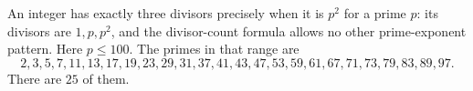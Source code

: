 An integer has exactly three divisors precisely when it is $p^2$ for a prime $p$: its divisors are $1,p,p^2$, and the divisor-count formula allows no other prime-exponent pattern. Here $p\le100$. The primes in that range are
\[2,3,5,7,11,13,17,19,23,29,31,37,41,43,47,53,59,61,67,71,73,79,83,89,97.\]
There are $\boxed{25}$ of them.
